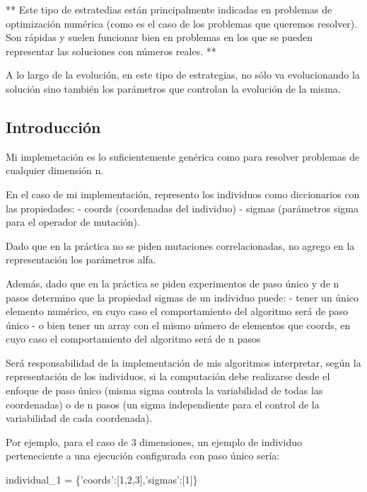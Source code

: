 \documentclass[11pt]{article}
\newenvironment{Shaded}{}{}
\newcommand{\DecValTok}[1]{\textcolor[rgb]{0.25,0.63,0.44}{{#1}}}
\newcommand{\StringTok}[1]{\textcolor[rgb]{0.25,0.44,0.63}{{#1}}}
\newcommand{\NormalTok}[1]{{#1}}
\newcommand{\OperatorTok}[1]{\textcolor[rgb]{0.40,0.40,0.40}{{#1}}}
\begin{document}
** Este tipo de estratedias están principalmente indicadas en problemas
de optimización numérica (como es el caso de los problemas que queremos
resolver). Son rápidas y suelen funcionar bien en problemas en los que
se pueden representar las soluciones con números reales. **

A lo largo de la evolución, en este tipo de estrategias, no sólo va
evolucionando la solución sino también los parámetros que controlan la
evolución de la misma.

\subsection{Introducción}\label{introducciuxf3n}

Mi implemetación es lo suficientemente genérica como para resolver
problemas de cualquier dimensión n.

En el caso de mi implementación, represento los individuos como
diccionarios con las propiedades: - coords (coordenadas del individuo) -
sigmas (parámetros sigma para el operador de mutación).

Dado que en la práctica no se piden mutaciones correlacionadas, no
agrego en la representación los parámetros alfa.

Además, dado que en la práctica se piden experimentos de paso único y de
n pasos determino que la propiedad sigmas de un individuo puede: - tener
un único elemento numérico, en cuyo caso el comportamiento del algoritmo
será de paso único - o bien tener un array con el mismo número de
elementos que coords, en cuyo caso el comportamiento del algoritmo será
de n pasos

Será responsabilidad de la implementación de mis algoritmos interpretar,
según la representación de los individuos, si la computación debe
realizarse desde el enfoque de paso único (misma sigma controla la
variabilidad de todas las coordenadas) o de n pasos (un sigma
independiente para el control de la variabilidad de cada coordenada).

Por ejemplo, para el caso de 3 dimensiones, un ejemplo de individuo
perteneciente a una ejecución configurada con paso único sería:

\begin{Shaded}
\begin{Highlighting}[]
\NormalTok{individual_1 }\OperatorTok{=} \NormalTok{\{}\StringTok{'coords'}\NormalTok{:[}\DecValTok{1}\NormalTok{,}\DecValTok{2}\NormalTok{,}\DecValTok{3}\NormalTok{],}\StringTok{'sigmas'}\NormalTok{:[}\DecValTok{1}\NormalTok{]\}}
\end{Highlighting}
\end{Shaded}
\end{document}
